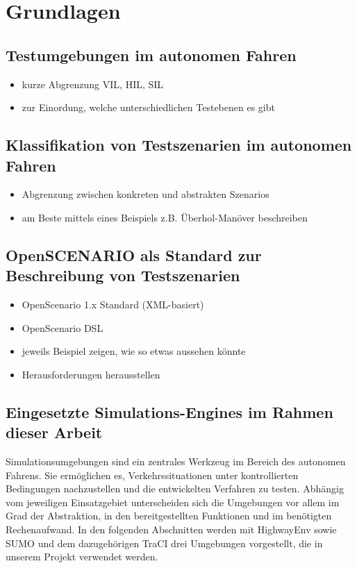 \chapter{Grundlagen}

\section{Testumgebungen im autonomen Fahren}
\begin{itemize}
    \item kurze Abgrenzung VIL, HIL, SIL
    \item zur Einordung, welche unterschiedlichen Testebenen es gibt
\end{itemize}
\section{Klassifikation von Testszenarien im autonomen Fahren}
\begin{itemize}
    \item Abgrenzung zwischen konkreten und abstrakten Szenarios
    \item am Beste mittels eines Beispiels z.B. Überhol-Manöver beschreiben
\end{itemize}
\section{OpenSCENARIO als Standard zur Beschreibung von Testszenarien}
\begin{itemize}
    \item OpenScenario 1.x Standard (XML-basiert) 
    \item OpenScenario DSL 
    \item jeweils Beispiel zeigen, wie so etwas aussehen könnte
    \item Herausforderungen herausstellen
\end{itemize}
\section{Eingesetzte Simulations-Engines im Rahmen dieser Arbeit}
Simulationsumgebungen sind ein zentrales Werkzeug im Bereich des autonomen Fahrens. Sie ermöglichen es, Verkehrssituationen unter kontrollierten Bedingungen nachzustellen und die entwickelten Verfahren zu testen. Abhängig vom jeweiligen Einsatzgebiet unterscheiden sich die Umgebungen vor allem im Grad der Abstraktion, in den bereitgestellten Funktionen und im benötigten Rechenaufwand. In den folgenden Abschnitten werden mit HighwayEnv sowie SUMO und dem dazugehörigen TraCI drei Umgebungen vorgestellt, die in unserem Projekt verwendet werden.
